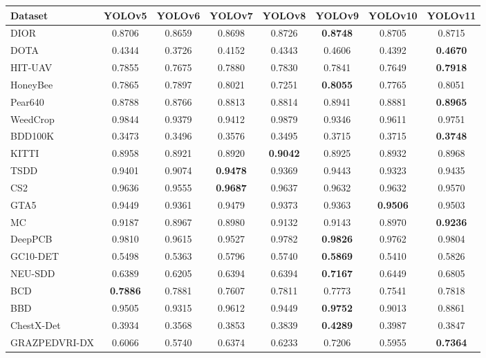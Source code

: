 \documentclass[runningheads]{llncs}
\begin{document}
\begin{table}[htbp]
\centering
\begin{tabular}{lccccccc}
\hline
Dataset & YOLOv5 & YOLOv6 & YOLOv7 & YOLOv8 & YOLOv9 & YOLOv10 & YOLOv11 \\
\hline
DIOR & 0.8706& 0.8659& 0.8698& 0.8726& \textbf{0.8748}& 0.8705& 0.8715
\\
DOTA & 0.4344& 0.3726 & 0.4152 & 0.4343 & 0.4606 & 0.4392 & \textbf{0.4670} \\
HIT-UAV& 0.7855 & 0.7675 & 0.7880 & 0.7830 & 0.7841 & 0.7649 & \textbf{0.7918} \\
\hline
HoneyBee & 0.7865 & 0.7897 & 0.8021 & 0.7251 & \textbf{0.8055} & 0.7765 & 0.8051 \\
Pear640 & 0.8788 & 0.8766 & 0.8813 & 0.8814 & 0.8941 & 0.8881 & \textbf{0.8965} \\
WeedCrop & 0.9844 & 0.9379 & 0.9412 & 0.9879 & 0.9346 & 0.9611 & 0.9751 \\
\hline
BDD100K & 0.3473 & 0.3496 & 0.3576 & 0.3495 & 0.3715 & 0.3715 & \textbf{0.3748} \\
KITTI & 0.8958 & 0.8921 & 0.8920 & \textbf{0.9042} & 0.8925 & 0.8932 & 0.8968 \\
TSDD & 0.9401 & 0.9074 & \textbf{0.9478} & 0.9369 & 0.9443 & 0.9323 & 0.9435 \\
\hline
CS2 & 0.9636 & 0.9555 & \textbf{0.9687} & 0.9637 & 0.9632 & 0.9632 & 0.9570 \\
GTA5 & 0.9449 & 0.9361 & 0.9479 & 0.9373 & 0.9363 & \textbf{0.9506} & 0.9503 \\
MC & 0.9187 & 0.8967 & 0.8980 & 0.9132 & 0.9143 & 0.8970 & \textbf{0.9236} \\
\hline
DeepPCB & 0.9810 & 0.9615 & 0.9527 & 0.9782 & \textbf{0.9826} & 0.9762 & 0.9804 \\
GC10-DET & 0.5498 & 0.5363 & 0.5796 & 0.5740 & \textbf{0.5869} & 0.5410 & 0.5826 \\
NEU-SDD & 0.6389 & 0.6205 & 0.6394 & 0.6394 & \textbf{0.7167} & 0.6449 & 0.6805 \\
\hline
BCD & \textbf{0.7886} & 0.7881 & 0.7607 & 0.7811 & 0.7773 & 0.7541 & 0.7818 \\
BBD & 0.9505 & 0.9315 & 0.9612 & 0.9449 & \textbf{0.9752} & 0.9013 & 0.8861 \\
ChestX-Det & 0.3934 & 0.3568 & 0.3853 & 0.3839 & \textbf{0.4289} & 0.3987 & 0.3847 \\
GRAZPEDVRI-DX & 0.6066 & 0.5740 & 0.6374 & 0.6233 & 0.7206 & 0.5955 & \textbf{0.7364} \\

\end{tabular}
\end{table}
\end{document}
